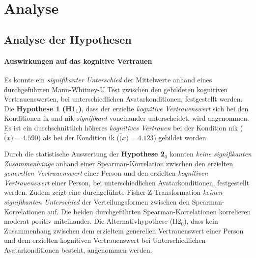 \documentclass[a4paper,11pt]{article}%
\renewcommand{\\}{\vspace*{0.5\baselineskip} \newline}
\begin{document}
\clearpage
\newpage
\section{Analyse}
\subsection{Analyse der Hypothesen}

\paragraph{Auswirkungen auf das kognitive Vertrauen}
Es konnte ein \textit{signifikanter Unterschied} der Mittelwerte anhand eines durchgeführten Mann-Whitney-U Test zwischen den gebildeten kognitiven Vertrauenswerten, bei unterschiedlichen Avatarkonditionen, festgestellt werden. 
Die \textbf{Hypothese 1 (H1$_{1}$)}, dass der erzielte \textit{kognitive Vertrauenswert} sich bei den Konditionen \ac{ik} und \ac{nik} \textit{signifikant} voneinander unterscheidet, wird angenommen. Es ist ein durchschnittlich höheres \textit{kognitives Vertrauen} bei der Kondition \ac{nik} ($\bar(x)=4.590$) als bei der Kondition \ac{ik} ($\bar(x)= 4.123$) gebildet worden.

Durch die statistische Auswertung der \textbf{Hypothese 2$_{0}$} konnten \textit{keine signifikanten Zusammenhänge} anhand einer Spearman-Korrelation zwischen den erzielten \textit{generellen Vertrauenswert} einer Person und den erzielten \textit{kognitiven Vertrauenswert} einer Person, bei unterschiedlichen Avatarkonditionen, festgestellt werden. Zudem zeigt eine durchgeführte Fisher-Z-Transformation \textit{keinen signifikanten Unterschied} der Verteilungsformen zwischen den Spearman-Korrelationen auf. \newline 
Die beiden durchgeführten Spearman-Korrelationen korrelieren moderat positiv miteinander. 
Die Alternativhypothese (H2$_{0}$), dass kein Zusammenhang zwischen dem erzieltem generellen Vertrauenswert einer Person und dem erzielten kognitiven Vertrauenswert bei Unterschiedlichen Avatarkonditionen besteht, angenommen werden.
\end{document}
